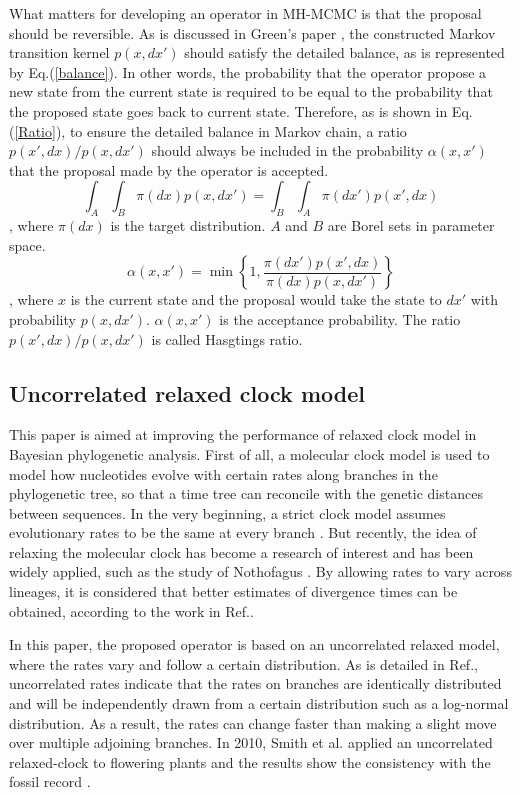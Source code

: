 \documentclass{bmcart}
\begin{document}
What matters for developing an operator in MH-MCMC is that the proposal should be reversible. As is discussed in Green's paper \cite{green1995reversible}, the constructed Markov transition kernel $p(x,dx')$ should satisfy the detailed balance, as is represented by Eq.(\ref{balance}). In other words, the probability that the operator propose a new state from the current state is required to be equal to the probability that the proposed state goes back to current state. Therefore, as is shown in Eq.(\ref{Ratio}), to ensure the detailed balance in Markov chain, a ratio ${p(x',dx)}/{p(x,dx')}$ should always be included in the probability $\alpha(x,x')$ that the proposal made by the operator is accepted.
\begin{equation}\label{balance}
\int_A {\int_B {\pi (dx)p(x,dx')} }  = \int_B {\int_A {\pi (dx')p(x',dx)} }
\end{equation}
, where ${\pi (dx)}$ is the target distribution. $A$ and $B$ are Borel sets in parameter space.
\begin{equation}\label{Ratio}
{\alpha}(x,x') = \min \left\{ {1,\frac{{\pi (dx'){p}(x',dx)}}{{\pi (dx){p}(x,dx')}}} \right\}
\end{equation}
, where $x$ is the current state and the proposal would take the state to $dx'$ with probability ${p(x,dx')}$. ${\alpha}(x,x')$ is the acceptance probability. The ratio ${p(x',dx)}/{p(x,dx')}$ is called Hasgtings ratio.
\subsection*{Uncorrelated relaxed clock model}
This paper is aimed at improving the performance of relaxed clock model in Bayesian phylogenetic analysis. First of all, a molecular clock model is used to model how nucleotides evolve with certain rates along branches in the phylogenetic tree, so that a time tree can reconcile with the genetic distances between sequences. In the very beginning, a strict clock model assumes evolutionary rates to be the same at every branch \cite{zuckerkandl1965evolutionary}. But recently, the idea of relaxing the molecular clock has become a research of interest and has been widely applied, such as the study of Nothofagus \cite{knapp2005relaxed}. By allowing rates to vary across lineages, it is considered that better estimates of divergence times can be obtained, according to the work in Ref.\cite{ho2005accuracy,renner2005relaxed,lepage2007general}. 

 In this paper, the proposed operator is based on an uncorrelated relaxed model, where the rates vary and follow a certain distribution. As is detailed in Ref.\cite{drummond2006relaxed}, uncorrelated rates indicate that the rates on branches are identically distributed and will be independently drawn from a certain distribution such as a log-normal distribution. As a result, the rates can change faster than making a slight move over multiple adjoining branches. In 2010, Smith et al. applied an uncorrelated relaxed-clock to flowering plants and the results show the consistency with the fossil record \cite{smith2010uncorrelated}.
\end{document}
